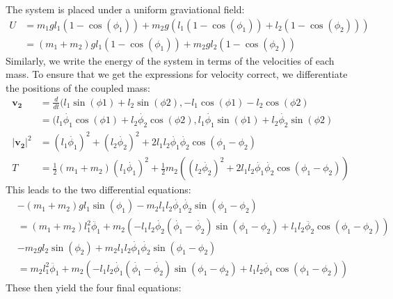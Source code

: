 \documentclass{article}
\renewcommand\vec\mathbf
\newcommand{\abs}[1]{\ensuremath{\left| #1 \right|}}
\newcommand{\ddt}{\frac{d}{dt}}
\begin{document}
The system is placed under a uniform graviational field:
\begin{align}
 U &= m_{1}gl_{1}(1-\cos{(\phi_{1})}) + m_{2}g(l_{1}(1-\cos{(\phi_{1})}) + l_{2}(1-\cos{(\phi_{2})})) \nonumber \\
   &= (m_{1}+m_{2})gl_{1}(1-\cos{(\phi_{1})}) + m_{2}gl_{2}(1-\cos{(\phi_{2})})
\end{align}
Similarly, we write the energy of the system in terms of the velocities of each mass. To ensure that we get the expressions for velocity correct, we differentiate the positions of the coupled mass:
\begin{align}
 \vec{v_{2}} &= \ddt (l_{1}\sin{(\phi{1})}+l_{2}\sin{(\phi{2})}, -l_{1}\cos{(\phi{1})}-l_{2}\cos{(\phi{2})} \nonumber \\
             &= (l_{1}\dot{\phi_{1}}\cos{(\phi{1})}+l_{2}\dot{\phi_{2}}\cos{(\phi{2})},
                 l_{1}\dot{\phi_{1}}\sin{(\phi{1})}+l_{2}\dot{\phi_{2}}\sin{(\phi{2})} \\
 \abs{\vec{v_{2}}}^{2} &= (l_{1}\dot{\phi_{1}})^{2}+(l_{2}\dot{\phi_{2}})^{2}+2l_{1}l_{2}\dot{\phi_{1}}\dot{\phi_{2}}\cos{(\phi_{1}-\phi_{2})} \\
 T &= \frac{1}{2}(m_{1}+m_{2})(l_{1}\dot{\phi_{1}})^{2} + \frac{1}{2}m_{2}((l_{2}\dot{\phi_{2}})^{2} + 2l_{1}l_{2}\dot{\phi_{1}}\dot{\phi_{2}}\cos{(\phi_{1}-\phi_{2})})
\end{align}
This leads to the two differential equations:
\begin{align}
&-(m_{1}+m_{2})gl_{1}\sin{(\phi_{1})} 
 -m_{2}l_{1}l_{2}\dot{\phi_{1}}\dot{\phi_{2}}\sin{(\phi_{1}-\phi_{2})} \nonumber \\
&= (m_{1}+m_{2})l_{1}^{2}\ddot{\phi_{1}} + 
  m_{2}(-l_{1}l_{2}\dot{\phi_{2}}(\dot{\phi_{1}}-\dot{\phi_{2}})\sin{(\phi_{1}-\phi_{2})}
        +l_{1}l_{2}\ddot{\phi_{2}}\cos{(\phi_{1}-\phi_{2})}) \\
&-m_{2}gl_{2}\sin{(\phi_{2})} 
 +m_{2}l_{1}l_{2}\dot{\phi_{1}}\dot{\phi_{2}}\sin{(\phi_{1}-\phi_{2})} \nonumber \\
&= m_{2}l_{1}^{2}\ddot{\phi_{1}} + 
  m_{2}(-l_{1}l_{2}\dot{\phi_{1}}(\dot{\phi_{1}}-\dot{\phi_{2}})\sin{(\phi_{1}-\phi_{2})}
        +l_{1}l_{2}\ddot{\phi_{1}}\cos{(\phi_{1}-\phi_{2})})
\end{align}
These then yield the four final equations:
\end{document}
